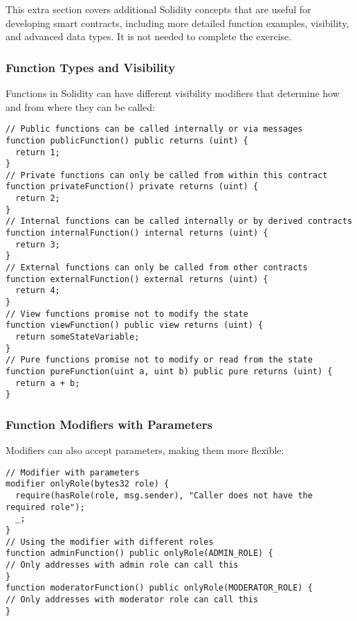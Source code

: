 \documentclass[12pt]{article}
\begin{document}
This extra section covers additional Solidity concepts that are useful for
developing smart contracts, including more detailed function examples,
visibility, and advanced data types. It is not needed to complete the exercise.

\subsubsection*{Function Types and Visibility}
Functions in Solidity can have different visibility modifiers that determine how and from where they can be called:

\noindent
\begin{minipage}[c]{\textwidth}
  \begin{lstlisting}[language=Solidity]
// Public functions can be called internally or via messages
function publicFunction() public returns (uint) {
  return 1;
}
// Private functions can only be called from within this contract
function privateFunction() private returns (uint) {
  return 2;
}
// Internal functions can be called internally or by derived contracts
function internalFunction() internal returns (uint) {
  return 3;
}
// External functions can only be called from other contracts
function externalFunction() external returns (uint) {
  return 4;
}
// View functions promise not to modify the state
function viewFunction() public view returns (uint) {
  return someStateVariable;
}
// Pure functions promise not to modify or read from the state
function pureFunction(uint a, uint b) public pure returns (uint) {
  return a + b;
}
\end{lstlisting}
\end{minipage}

\subsubsection*{Function Modifiers with Parameters}

Modifiers can also accept parameters, making them more flexible:

\noindent
\begin{minipage}[c]{\textwidth}
  \begin{lstlisting}[language=Solidity]
// Modifier with parameters
modifier onlyRole(bytes32 role) {
  require(hasRole(role, msg.sender), "Caller does not have the required role");
  _;
}
// Using the modifier with different roles
function adminFunction() public onlyRole(ADMIN_ROLE) {
// Only addresses with admin role can call this
}
function moderatorFunction() public onlyRole(MODERATOR_ROLE) {
// Only addresses with moderator role can call this
}
\end{lstlisting}
\end{minipage}
\end{document}
